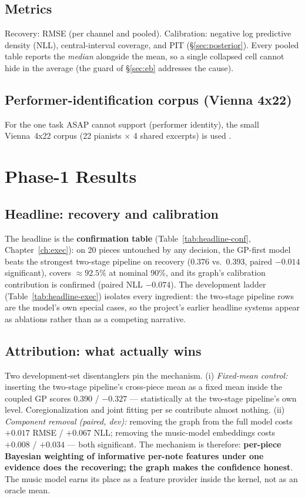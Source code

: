 \documentclass[11pt,a4paper]{report}
\newcommand{\nConfPieces}{20}
\newcommand{\rmseGP}{0.376}            %
\newcommand{\covGP}{92.5\%}
\newcommand{\rmseConfOldHead}{0.393}   %
\newcommand{\dRmseConf}{$-0.014$}      %
\newcommand{\dNllGraphConf}{$-0.074$}  %
\begin{document}
\section{Metrics}
Recovery: RMSE (per channel and pooled). Calibration: negative log predictive
density (NLL), central-interval coverage, and PIT (\S\ref{sec:posterior}). Every
pooled table reports the \emph{median} alongside the mean, so a single collapsed
cell cannot hide in the average (the guard of \S\ref{sec:eb} addresses the cause).

\section{Performer-identification corpus (Vienna 4x22)}
For the one task ASAP cannot support (performer identity), the small Vienna~4x22
corpus (22 pianists $\times$ 4 shared excerpts) is used \cite{vienna4x22}.

\chapter{Phase-1 Results}\label{ch:results}

\section{Headline: recovery and calibration}
The headline is the \textbf{confirmation table} (Table~\ref{tab:headline-conf},
Chapter~\ref{ch:exec}): on \nConfPieces{} pieces untouched by any decision, the
GP-first model beats the strongest two-stage pipeline on recovery
(\rmseGP{} vs.\ \rmseConfOldHead, paired \dRmseConf{} significant), covers
$\approx\covGP$ at nominal 90\%, and its graph's calibration contribution is
confirmed (paired NLL \dNllGraphConf). The development ladder
(Table~\ref{tab:headline-exec}) isolates every ingredient: the two-stage pipeline
rows are the model's own special cases, so the project's earlier headline systems
appear as ablations rather than as a competing narrative.

\section{Attribution: what actually wins}\label{sec:attribution}
Two development-set disentanglers pin the mechanism. (i) \emph{Fixed-mean control:}
inserting the two-stage pipeline's cross-piece mean as a fixed mean inside the
coupled GP scores 0.390 / $-0.327$ --- statistically at the two-stage pipeline's own
level. Coregionalization and joint fitting per se contribute almost nothing.
(ii) \emph{Component removal (paired, dev):} removing the graph from the full model
costs $+0.017$ RMSE / $+0.067$ NLL; removing the music-model embeddings costs
$+0.008$ / $+0.034$ --- both significant. The mechanism is therefore: \textbf{per-piece
Bayesian weighting of informative per-note features under one evidence does the
recovering; the graph makes the confidence honest}. The music model earns its place
as a feature provider inside the kernel, not as an oracle mean.
\end{document}
